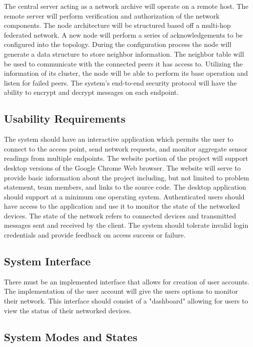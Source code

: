 \documentclass[tikz,a4paper,titlepage]{article}
\begin{document}
The central server acting as a network archive will operate on a remote host. The remote server will perform verification and authorization of the network components. The node architecture will be structured based off a multi-hop federated network. A new node will perform a series of acknowledgements to be configured into the topology. During the configuration process the node will generate a data structure to store neighbor information. The neighbor table will be used to communicate with the connected peers it has access to. Utilizing the information of its cluster, the node will be able to perform its base operation and listen for failed peers. The system's end-to-end security protocol will have the ability to encrypt and decrypt messages on each endpoint. 

\subsection{Usability Requirements} %

The system should have an interactive application which permits the user to connect to the access point, send network requests, and monitor aggregate sensor readings from multiple endpoints. The website portion of the project will support desktop versions of the Google Chrome Web browser. The website will serve to provide basic information about the project including, but not limited to problem statement, team members, and links to the source code. The desktop application should support at a minimum one operating system. Authenticated users should have access to the application and use it to monitor the state of the networked devices. The state of the network refers to connected devices and transmitted messages sent and received by the client. The system should tolerate invalid login credentials and provide feedback on access success or failure.

\subsection{System Interface} %

There must be an implemented interface that allows for creation of user accounts. The implementation of the user account will give the users options to monitor their network. This interface should consist of a "dashboard" allowing for users to view the status of their networked devices.

\subsection{System Modes and States} %
\end{document}
